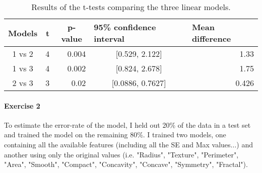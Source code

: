 \documentclass{paper}
\begin{document}
\begin{table}[]
\centering
\caption{Results of the t-tests comparing the three linear models.}
\label{tab:t}
\begin{tabular}{|c|r|r|c|r|}
\hline
\textbf{Models} & \textbf{t} & \multicolumn{1}{c|}{\textbf{p-value}} & \multicolumn{1}{l|}{\textbf{95\% confidence interval}} & \multicolumn{1}{l|}{\textbf{Mean difference}} \\ \hline
1 vs 2          & 4                    & 0.004                                 & {[}0.529, 2.122{]}                                           & 1.33                                              \\ 
1 vs 3          & 4                    & 0.002                                 & {[}0.824, 2.678{]}                                           & 1.75                                              \\ 
2 vs 3          & 3                    & 0.02                                  & {[}0.0886, 0.7627{]}                                         & 0.426                                             \\ \hline
\end{tabular}
\end{table}


\paragraph{Exercise 2}

To estimate the error-rate of the model, I held out 20\% of the data in a test set and trained the model on the remaining 80\%.
I trained two models, one containing all the available features (including all the SE and Max values...) and another using only the original values (i.e. "Radius",   "Texture",    "Perimeter",  "Area",       "Smooth",  "Compact",    "Concavity",  "Concave",    "Symmetry",   "Fractal"). 
\end{document}
